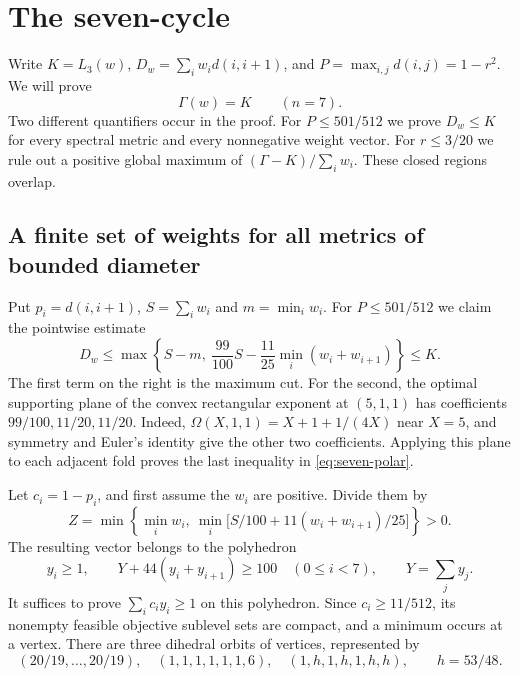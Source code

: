 \documentclass[11pt,a4paper]{article}
\theoremstyle{definition}
\begin{document}
\section{The seven-cycle}\label{sec:seven}

Write $K=L_3(w)$, $D_w=\sum_i w_i d(i,i+1)$, and
$P=\max_{i,j}d(i,j)=1-r^2$. We will prove
\[
                    \Gamma(w)=K\qquad(n=7).
\]
Two different quantifiers occur in the proof. For $P\le501/512$ we prove
$D_w\le K$ for every spectral metric and every nonnegative weight vector.
For $r\le3/20$ we rule out a positive global maximum of
$(\Gamma-K)/\sum_i w_i$. These closed regions overlap.

\subsection{A finite set of weights for all metrics of bounded diameter}
Put $p_i=d(i,i+1)$, $S=\sum_iw_i$ and $m=\min_iw_i$. For $P\le501/512$
we claim the pointwise estimate
\begin{equation}\label{eq:seven-polar}
 D_w\le\max\left\{S-m,\ \frac{99}{100}S
          -\frac{11}{25}\min_i(w_i+w_{i+1})\right\}\le K.
\end{equation}
The first term on the right is the maximum cut. For the second, the optimal
supporting plane of the convex rectangular exponent at $(5,1,1)$ has
coefficients $99/100,11/20,11/20$. Indeed,
$\Omega(X,1,1)=X+1+1/(4X)$ near $X=5$, and symmetry and Euler's identity
give the other two coefficients. Applying this plane to each adjacent
fold proves the last inequality in \eqref{eq:seven-polar}.

Let $c_i=1-p_i$, and first assume the $w_i$ are positive. Divide them by
\[
 Z=\min\left\{\min_i w_i,\
       \min_i\big[S/100+11(w_i+w_{i+1})/25\big]\right\}>0 .
\]
The resulting vector belongs to the polyhedron
\[
 y_i\ge1,\qquad Y+44(y_i+y_{i+1})\ge100\quad(0\le i<7),
       \qquad Y=\sum_j y_j .
\]
It suffices to prove $\sum_i c_i y_i\ge1$ on this polyhedron. Since
$c_i\ge11/512$, its nonempty feasible objective sublevel sets are compact,
and a minimum occurs at a vertex. There are three dihedral orbits of vertices, represented by
\begin{equation}\label{eq:seven-three-vertices}
 (20/19,\ldots,20/19),\quad(1,1,1,1,1,1,6),\quad
 (1,h,1,h,1,h,h),\qquad h=53/48 .
\end{equation}
\end{document}
